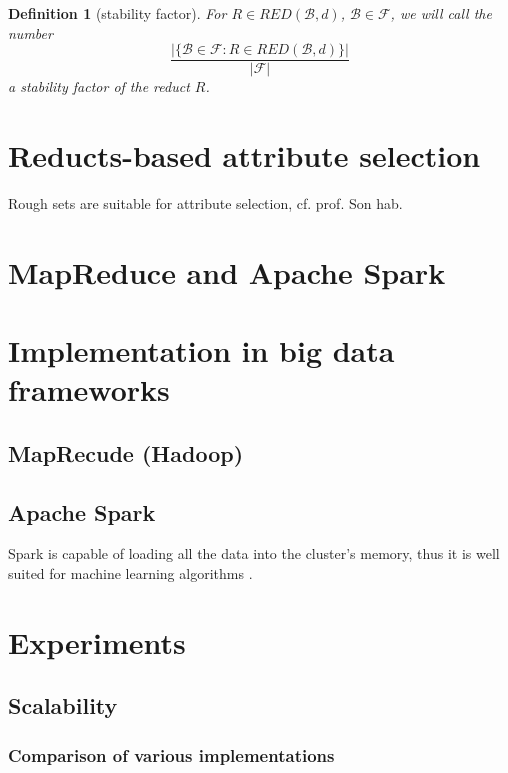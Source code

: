 \documentclass[12pt]{pracamgr}
\newtheorem{definition}{Definition}[chapter]
\begin{document}
\begin{definition}[stability factor]

  For $R \in RED(\mathcal{B},d)$, $\mathcal{B} \in \mathcal{F}$, we will call the number
  $$ \frac{|\{\mathcal{B} \in \mathcal{F} : R \in RED(\mathcal{B}, d)\}|}{|\mathcal{F}|} $$
  a \emph{stability factor} of the reduct $R$.
  
\end{definition}


\chapter{Reducts-based attribute selection}
\label{chap:reductsattrsel}

Rough sets are suitable for attribute selection, cf. prof. Son hab.

\chapter{MapReduce and Apache Spark}
\label{chap:mapredspark}
  
  
\chapter{Implementation in big data frameworks}
\label{chap:implattlsel}

\section{MapRecude (Hadoop)}

\section{Apache Spark}

Spark is capable of loading all the data into the cluster's memory, thus it is well suited for machine learning algorithms \cite{zaharia}.


\chapter{Experiments}
\label{chap:experiments}

\section{Scalability}
\subsection{Comparison of various implementations}
\end{document}
